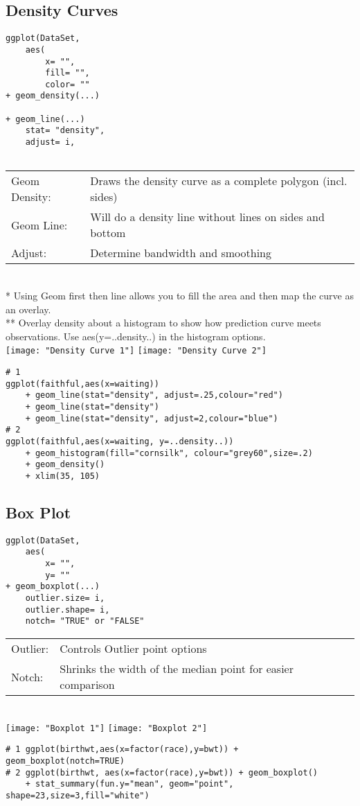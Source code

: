 \documentclass[]{article}
\begin{document}
\subsection{Density Curves}
\begin{verbatim}
ggplot(DataSet,
	aes(
		x= "",
		fill= "",
		color= ""
+ geom_density(...)
	
+ geom_line(...)
	stat= "density",
	adjust= i,
	
\end{verbatim}
\begin{tabular}{l l}
	Geom Density: & Draws the density curve as a complete polygon (incl. sides) \\
	Geom Line: & Will do a density line without lines on sides and bottom \\
	Adjust: & Determine bandwidth and smoothing \\
\end{tabular} \\
* Using Geom first then line allows you to fill the area 
and then map the curve as an overlay. \\
** Overlay density about a histogram to show how prediction curve
meets observations. Use aes(y=..density..) in the histogram options.\\
\texttt{[image: "Density Curve 1"]}
\texttt{[image: "Density Curve 2"]} \\
\begin{verbatim}
# 1 
ggplot(faithful,aes(x=waiting)) 
	+ geom_line(stat="density", adjust=.25,colour="red") 
	+ geom_line(stat="density") 
	+ geom_line(stat="density", adjust=2,colour="blue")
# 2 
ggplot(faithful,aes(x=waiting, y=..density..)) 
	+ geom_histogram(fill="cornsilk", colour="grey60",size=.2) 
	+ geom_density() 
	+ xlim(35, 105)
\end{verbatim}

\subsection{Box Plot}
\begin{verbatim}
ggplot(DataSet,
	aes(
		x= "",
		y= ""
+ geom_boxplot(...)
	outlier.size= i,
	outlier.shape= i,
	notch= "TRUE" or "FALSE"
\end{verbatim}
\begin{tabular}{l l}
	Outlier: & Controls Outlier point options \\
	Notch: & Shrinks the width of the median point for easier comparison \\	
\end{tabular} \\
\texttt{[image: "Boxplot 1"]}
\texttt{[image: "Boxplot 2"]} \\
\begin{verbatim}
# 1 ggplot(birthwt,aes(x=factor(race),y=bwt)) + geom_boxplot(notch=TRUE)
# 2 ggplot(birthwt, aes(x=factor(race),y=bwt)) + geom_boxplot() 
	+ stat_summary(fun.y="mean", geom="point", shape=23,size=3,fill="white")
\end{verbatim}
\end{document}
